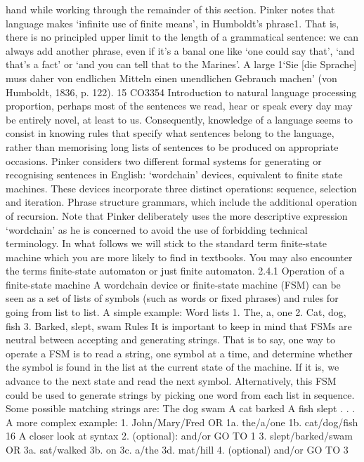 hand while working through the remainder of this section.
Pinker notes that language makes ‘infinite use of finite means’, in Humboldt’s
phrase1. That is, there is no principled upper limit to the length of a grammatical
sentence: we can always add another phrase, even if it’s a banal one like ‘one could
say that’, ‘and that’s a fact’ or ‘and you can tell that to the Marines’. A large
1‘Sie [die Sprache] muss daher von endlichen Mitteln einen unendlichen Gebrauch machen’ (von Humboldt,
1836, p. 122).
15
CO3354 Introduction to natural language processing
proportion, perhaps most of the sentences we read, hear or speak every day may be
entirely novel, at least to us. Consequently, knowledge of a language seems to
consist in knowing rules that specify what sentences belong to the language, rather
than memorising long lists of sentences to be produced on appropriate occasions.
Pinker considers two different formal systems for generating or recognising
sentences in English:
‘wordchain’ devices, equivalent to finite state machines. These devices
incorporate three distinct operations: sequence, selection and iteration.
Phrase structure grammars, which include the additional operation of recursion.
Note that Pinker deliberately uses the more descriptive expression ‘wordchain’ as he
is concerned to avoid the use of forbidding technical terminology. In what follows
we will stick to the standard term finite-state machine which you are more likely to
find in textbooks. You may also encounter the terms finite-state automaton or just
finite automaton.
2.4.1 Operation of a finite-state machine
A wordchain device or finite-state machine (FSM) can be seen as a set of lists of
symbols (such as words or fixed phrases) and rules for going from list to list. A
simple example:
Word lists
1. The, a, one
2. Cat, dog, fish
3. Barked, slept, swam
Rules
It is important to keep in mind that FSMs are neutral between accepting and
generating strings. That is to say, one way to operate a FSM is to read a string, one
symbol at a time, and determine whether the symbol is found in the list at the
current state of the machine. If it is, we advance to the next state and read the next
symbol. Alternatively, this FSM could be used to generate strings by picking one
word from each list in sequence. Some possible matching strings are:
The dog swam
A cat barked
A fish slept
. . .
A more complex example:
1. John/Mary/Fred OR
1a. the/a/one
1b. cat/dog/fish
16
A closer look at syntax
2. (optional): and/or GO TO 1
3. slept/barked/swam OR
3a. sat/walked
3b. on
3c. a/the
3d. mat/hill
4. (optional) and/or GO TO 3
